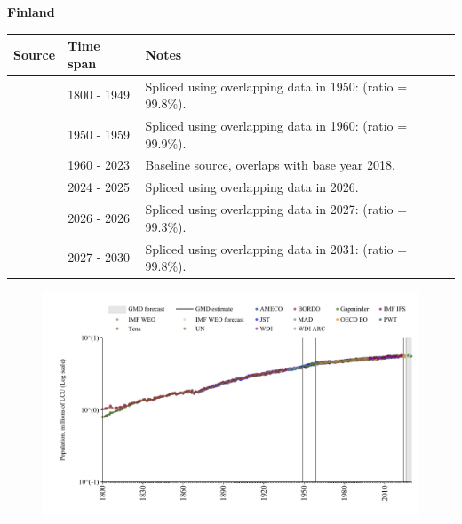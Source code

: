 \documentclass[12pt,a4paper,landscape]{article}
\begin{document}
\begin{adjustbox}{max totalsize={\paperwidth}{\paperheight},center}
\begin{minipage}[t][\textheight][t]{\textwidth}
\vspace*{0.5cm}
{}
\begin{center}
{\Large\bfseries Finland}
\end{center}
\vspace{0.5cm}
\begin{table}[H]
\centering
\small
\begin{tabular}{|l|l|l|}
\hline
\textbf{Source} & \textbf{Time span} & \textbf{Notes} \\
\hline
\rowcolor{white}\cite{Gapminder}& 1800 - 1949 &Spliced using overlapping data in 1950: (ratio = 99.8\%).\\
\rowcolor{lightgray}\cite{IMF_IFS}& 1950 - 1959 &Spliced using overlapping data in 1960: (ratio = 99.9\%).\\
\rowcolor{white}\cite{WDI}& 1960 - 2023 &Baseline source, overlaps with base year 2018.\\
\rowcolor{lightgray}\cite{OECD_EO}& 2024 - 2025 &Spliced using overlapping data in 2026.\\
\rowcolor{white}\cite{AMECO}& 2026 - 2026 &Spliced using overlapping data in 2027: (ratio = 99.3\%).\\
\rowcolor{lightgray}\cite{Gapminder}& 2027 - 2030 &Spliced using overlapping data in 2031: (ratio = 99.8\%).\\
\hline
\end{tabular}
\end{table}
\begin{figure}[H]
\centering
\includegraphics[width=\textwidth,height=0.6\textheight,keepaspectratio]{graphs/FIN_pop.pdf}
\end{figure}
\end{minipage}
\end{adjustbox}
\end{document}
